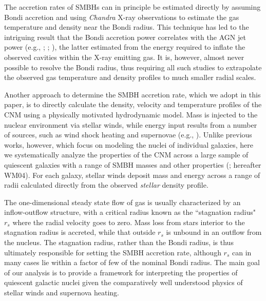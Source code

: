 \documentclass[usenatbib,fleqn]{mn2e}
\newcommand{\rs}{r_s}
\begin{document}
The accretion rates of SMBHs can in principle be estimated directly by
assuming Bondi accretion and using {\it Chandra} X-ray observations to
estimate the gas temperature and density near the Bondi radius.  This
technique has led to the intriguing result that the Bondi accretion
power correlates with the AGN jet power (e.g.,
\citealt{AllenDunn+:2006a}; \citealt{Russell+13};
\citealt{FujitaKawakatu+:2014a}), the latter estimated from the energy
required to inflate the observed cavities within the X-ray emitting
gas.  It is, however, almost never possible to resolve the Bondi
radius, thus requiring all such studies to extrapolate the observed
gas temperature and density profiles to much smaller radial scales.

Another approach to determine the SMBH accretion rate, which we adopt
in this paper, is to directly calculate the density, velocity and
temperature profiles of the CNM using a physically motivated
hydrodynamic model.  Mass is injected to the nuclear environment via
stellar winds, while energy input results from a number of sources,
such as wind shock heating and supernovae (e.g.,
\citealt{Quataert:2004a,De-ColleGuillochon+:2012a,ShcherbakovWong+:2014a}).
Unlike previous works, however, which focus on modeling the nuclei of
individual galaxies, here we systematically analyze the properties of
the CNM across a large sample of quiescent galaxies with a range of
SMBH masses and other properties (\citealt{WangMerritt:2004a};
hereafter WM04).  For each galaxy, stellar winds deposit mass and
energy across a range of radii calculated directly from the observed
{\it stellar} density profile.

The one-dimensional steady state flow of gas is usually characterized
by an inflow-outflow structure, with a critical radius known as the
``stagnation radius" $\rs$ where the radial velocity goes to zero.
Mass loss from stars interior to the stagnation radius is accreted,
while that outside $\rs$ is unbound in an outflow from the nucleus.
The stagnation radius, rather than the Bondi radius, is thus
ultimately responsible for setting the SMBH accretion rate, although
$\rs$ can in many cases lie within a factor of few of the
nominal Bondi radius.
The main goal of our analysis is to provide a framework for
interpreting the properties of quiescent galactic nuclei given the
comparatively well understood physics of stellar winds and supernova
heating.
\end{document}
